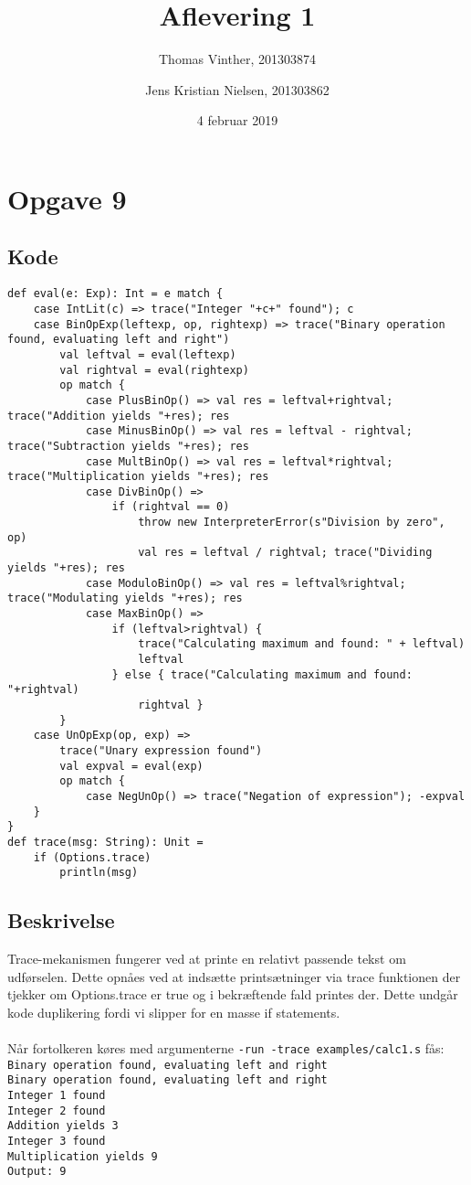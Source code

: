 \documentclass[a4paper, 10pt]{article}
\title{Aflevering 1}
\author{Thomas Vinther, 201303874 \and Jens Kristian Nielsen, 201303862}
\date{4 februar 2019}
\begin{document}
\maketitle
\section*{Opgave 9}
\subsection*{Kode}
\begin{lstlisting}
def eval(e: Exp): Int = e match {
	case IntLit(c) => trace("Integer "+c+" found"); c
	case BinOpExp(leftexp, op, rightexp) => trace("Binary operation found, evaluating left and right")
		val leftval = eval(leftexp)
		val rightval = eval(rightexp)
		op match {
			case PlusBinOp() => val res = leftval+rightval; trace("Addition yields "+res); res
			case MinusBinOp() => val res = leftval - rightval; trace("Subtraction yields "+res); res
			case MultBinOp() => val res = leftval*rightval; trace("Multiplication yields "+res); res
			case DivBinOp() =>
				if (rightval == 0)
					throw new InterpreterError(s"Division by zero", op)
					val res = leftval / rightval; trace("Dividing yields "+res); res
			case ModuloBinOp() => val res = leftval%rightval; trace("Modulating yields "+res); res
			case MaxBinOp() =>
				if (leftval>rightval) {
					trace("Calculating maximum and found: " + leftval)
					leftval
				} else { trace("Calculating maximum and found: "+rightval)
					rightval }
		}
	case UnOpExp(op, exp) =>
		trace("Unary expression found")
		val expval = eval(exp)
		op match {
			case NegUnOp() => trace("Negation of expression"); -expval
	}
}
def trace(msg: String): Unit =
	if (Options.trace)
		println(msg)
\end{lstlisting}
\subsection*{Beskrivelse}
Trace-mekanismen fungerer ved at printe en relativt passende tekst om udførselen. Dette opnåes ved at indsætte printsætninger via trace funktionen der tjekker om Options.trace er true og i bekræftende fald printes der. Dette undgår kode duplikering fordi vi slipper for en masse if statements.\\
\\
Når fortolkeren køres med argumenterne \texttt{-run -trace examples/calc1.s} fås: \\
\texttt{Binary operation found, evaluating left and right\\
Binary operation found, evaluating left and right\\
Integer 1 found\\
Integer 2 found\\
Addition yields 3\\
Integer 3 found\\
Multiplication yields 9\\
Output: 9}
\end{document}
